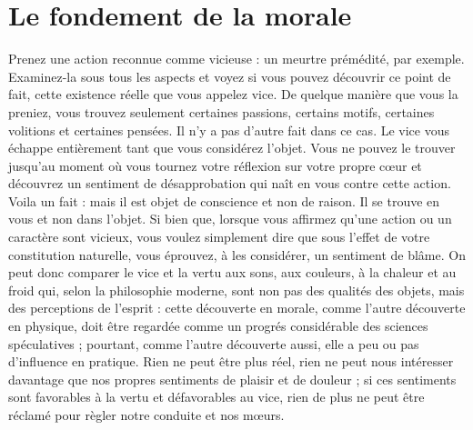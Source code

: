 
\section{Le fondement de la morale}
Prenez une action reconnue comme vicieuse : un meurtre
prémédité, par exemple. Examinez-la sous tous les aspects
et voyez si vous pouvez découvrir ce point de fait, cette
existence réelle que vous appelez vice. De quelque manière
que vous la preniez, vous trouvez seulement certaines
passions, certains motifs, certaines volitions et certaines
pensées. Il n’y a pas d’autre fait dans ce cas. Le vice vous
échappe entièrement tant que vous considérez l'objet.
Vous ne pouvez le trouver jusqu’au moment où vous
tournez votre réflexion sur votre propre c{\oe}ur et découvrez
un sentiment de désapprobation qui naît en vous contre
cette action. Voila un fait : mais il est objet de conscience
et non de raison. Il se trouve en vous et non dans l'objet.
Si bien que, lorsque vous affirmez qu’une action ou un
caractère sont vicieux, vous voulez simplement dire que
sous l’effet de votre constitution naturelle, vous éprouvez,
à les considérer, un sentiment de blâme. On peut donc
comparer le vice et la vertu aux sons, aux couleurs, à la
chaleur et au froid qui, selon la philosophie moderne, sont
non pas des qualités des objets, mais des perceptions de
l'esprit : cette découverte en morale, comme l'autre
découverte en physique, doit être regardée comme un
progrés considérable des sciences spéculatives ; pourtant,
comme l’autre découverte aussi, elle a peu ou pas d’influence
en pratique. Rien ne peut être plus réel, rien ne
peut nous intéresser davantage que nos propres sentiments
de plaisir et de douleur ; si ces sentiments sont favorables
à la vertu et défavorables au vice, rien de plus ne peut
être réclamé pour règler notre conduite et nos m{\oe}urs.

